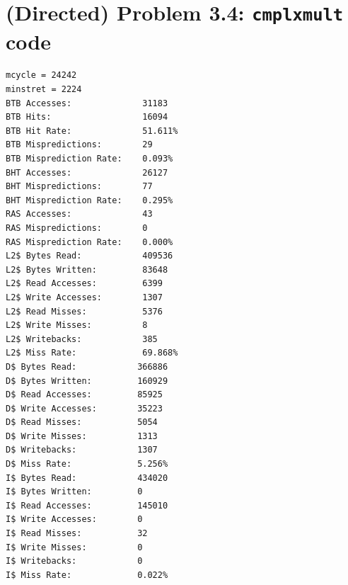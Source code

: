 \documentclass[11pt]{article}
\begin{document}
\section*{(Directed) Problem 3.4: \texttt{cmplxmult} code}
\begin{verbatim}
mcycle = 24242
minstret = 2224
BTB Accesses:              31183
BTB Hits:                  16094
BTB Hit Rate:              51.611%
BTB Mispredictions:        29
BTB Misprediction Rate:    0.093%
BHT Accesses:              26127
BHT Mispredictions:        77
BHT Misprediction Rate:    0.295%
RAS Accesses:              43
RAS Mispredictions:        0
RAS Misprediction Rate:    0.000%
L2$ Bytes Read:            409536
L2$ Bytes Written:         83648
L2$ Read Accesses:         6399
L2$ Write Accesses:        1307
L2$ Read Misses:           5376
L2$ Write Misses:          8
L2$ Writebacks:            385
L2$ Miss Rate:             69.868%
D$ Bytes Read:            366886
D$ Bytes Written:         160929
D$ Read Accesses:         85925
D$ Write Accesses:        35223
D$ Read Misses:           5054
D$ Write Misses:          1313
D$ Writebacks:            1307
D$ Miss Rate:             5.256%
I$ Bytes Read:            434020
I$ Bytes Written:         0
I$ Read Accesses:         145010
I$ Write Accesses:        0
I$ Read Misses:           32
I$ Write Misses:          0
I$ Writebacks:            0
I$ Miss Rate:             0.022%
\end{verbatim}
\end{document}
